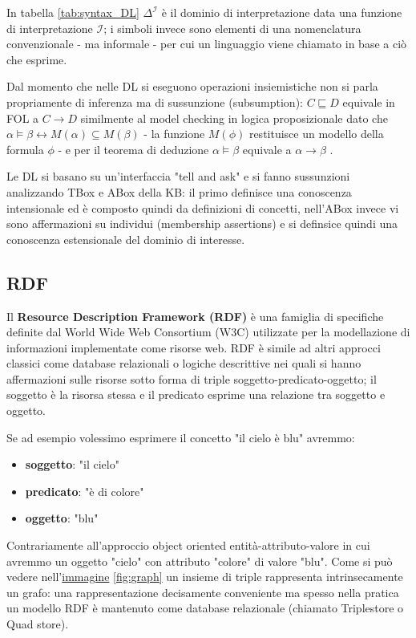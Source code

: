 \documentclass{article}
\begin{document}
In tabella \ref{tab:syntax_DL} $\Delta^{\mathcal{I}}$ è il dominio di interpretazione data una funzione di interpretazione $\mathcal{I}$; i simboli invece sono elementi di una nomenclatura convenzionale - ma informale - per cui un linguaggio viene chiamato in base a ciò che esprime. 

Dal momento che nelle DL si eseguono operazioni insiemistiche non si parla propriamente di inferenza ma di sussunzione (subsumption): $C \sqsubseteq D$ equivale in FOL a $C \rightarrow D$ similmente al model checking in logica proposizionale dato che $\alpha \models \beta \longleftrightarrow M(\alpha) \subseteq M(\beta)$ - la funzione $M(\phi)$ restituisce un modello della formula $\phi$ - e per il teorema di deduzione $\alpha \models \beta$ equivale a $\alpha \rightarrow \beta$ .

Le DL si basano su un'interfaccia "tell and ask" e si fanno sussunzioni analizzando TBox e ABox della KB: il primo definisce una conoscenza intensionale ed è composto quindi da definizioni di concetti, nell'ABox invece vi sono affermazioni su individui (membership assertions) e si definsice quindi una conoscenza estensionale del dominio di interesse.

\subsection{RDF}
Il \textbf{Resource Description Framework (RDF)} è una famiglia di specifiche definite dal World Wide Web Consortium (W3C) utilizzate per la modellazione di informazioni implementate come risorse web. RDF è simile ad altri approcci classici come database relazionali o logiche descrittive nei quali si hanno affermazioni sulle risorse sotto forma di triple soggetto-predicato-oggetto; il soggetto è la risorsa stessa e il predicato esprime una relazione tra soggetto e oggetto.

Se ad esempio volessimo esprimere il concetto "il cielo è blu" avremmo:
\begin{itemize}
    \item [] \textbf{soggetto}: "il cielo"
    \item [] \textbf{predicato}: "è di colore"
    \item [] \textbf{oggetto}: "blu"
\end{itemize}

Contrariamente all'approccio object oriented entità-attributo-valore in cui avremmo un oggetto "cielo" con attributo "colore" di valore "blu". Come si può vedere nell'\href{https://book.validatingrdf.com/bookHtml008.html}{immagine} \ref{fig:graph} un insieme di triple rappresenta intrinsecamente un grafo: una rappresentazione decisamente conveniente ma spesso nella pratica un modello RDF è mantenuto come database relazionale (chiamato Triplestore o Quad store).
\end{document}
